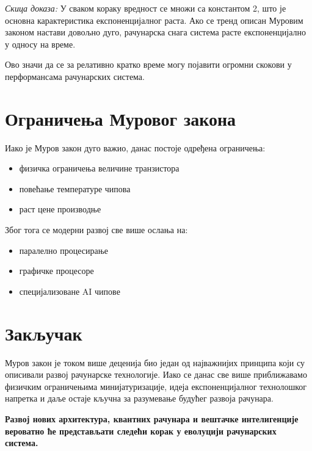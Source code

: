 \documentclass{article}
\begin{document}
\textit{Скица доказа:}  
У сваком кораку вредност се множи са константом 2, што је основна карактеристика 
експоненцијалног раста.
Ако се тренд описан Муровим законом настави довољно дуго, рачунарска снага система 
расте експоненцијално у односу на време.


Ово значи да се за релативно кратко време могу појавити огромни скокови у перформансама 
рачунарских система.

\section{Ограничења Муровог закона}

Иако је Муров закон дуго важио, данас постоје одређена ограничења:

\begin{itemize}
\item физичка ограничења величине транзистора
\item повећање температуре чипова
\item раст цене производње
\end{itemize}

Због тога се модерни развој све више ослања на:

\begin{itemize}
\item паралелно процесирање
\item графичке процесоре
\item специјализоване AI чипове
\end{itemize}

\section{Закључак}

Муров закон је током више деценија био један од најважнијих принципа који су 
описивали развој рачунарске технологије. Иако се данас све више приближавамо 
физичким ограничењима минијатуризације, идеја експоненцијалног технолошког 
напретка и даље остаје кључна за разумевање будућег развоја рачунара.

\textbf{Развој нових архитектура, квантних рачунара и вештачке интелигенције 
вероватно ће представљати следећи корак у еволуцији рачунарских система.}
\end{document}
